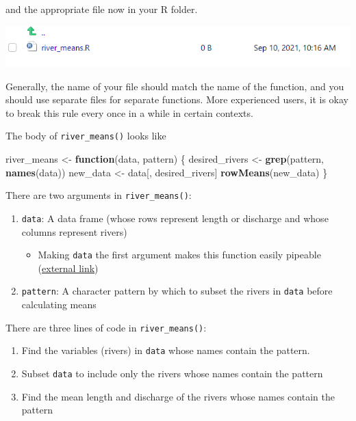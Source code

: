 \documentclass[
]{book}
\newenvironment{Shaded}{\begin{snugshade}}{\end{snugshade}}
\newcommand{\ControlFlowTok}[1]{\textcolor[rgb]{0.13,0.29,0.53}{\textbf{#1}}}
\newcommand{\KeywordTok}[1]{\textcolor[rgb]{0.13,0.29,0.53}{\textbf{#1}}}
\newcommand{\NormalTok}[1]{#1}
\newcommand{\StringTok}[1]{\textcolor[rgb]{0.31,0.60,0.02}{#1}}
\providecommand{\tightlist}{%
  \setlength{\itemsep}{0pt}\setlength{\parskip}{0pt}}
\begin{document}
and the appropriate file now in your R folder.

\includegraphics[width=1\linewidth]{images/newrpack_function}

Generally, the name of your file should match the name of the function, and you should use separate files for separate functions. More experienced users, it is okay to break this rule every once in a while in certain contexts.

The body of \texttt{river\_means()} looks like

\begin{Shaded}
\begin{Highlighting}[]
\NormalTok{river_means <-}\StringTok{ }\ControlFlowTok{function}\NormalTok{(data, pattern) \{}
\NormalTok{  desired_rivers <-}\StringTok{ }\KeywordTok{grep}\NormalTok{(pattern, }\KeywordTok{names}\NormalTok{(data))}
\NormalTok{  new_data <-}\StringTok{ }\NormalTok{data[, desired_rivers]}
  \KeywordTok{rowMeans}\NormalTok{(new_data)}
\NormalTok{\}}
\end{Highlighting}
\end{Shaded}

There are two arguments in \texttt{river\_means()}:

\begin{enumerate}
\def\labelenumi{\arabic{enumi}.}
\tightlist
\item
  \texttt{data}: A data frame (whose rows represent length or discharge and whose columns represent rivers)

  \begin{itemize}
  \tightlist
  \item
    Making \texttt{data} the first argument makes this function easily pipeable (\href{https://r4ds.had.co.nz/pipes.html}{external link})
  \end{itemize}
\item
  \texttt{pattern}: A character pattern by which to subset the rivers in \texttt{data} before calculating means
\end{enumerate}

There are three lines of code in \texttt{river\_means()}:

\begin{enumerate}
\def\labelenumi{\arabic{enumi}.}
\tightlist
\item
  Find the variables (rivers) in \texttt{data} whose names contain the pattern.
\item
  Subset \texttt{data} to include only the rivers whose names contain the pattern
\item
  Find the mean length and discharge of the rivers whose names contain the pattern
\end{enumerate}
\end{document}
